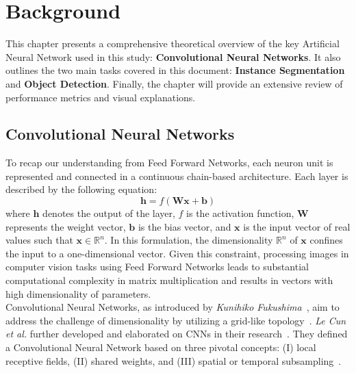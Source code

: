 \chapter{Background}
This chapter presents a comprehensive theoretical overview of the key Artificial Neural Network used in this study: \textbf{Convolutional Neural Networks}. It also outlines the two main tasks covered in this document: \textbf{Instance Segmentation} and \textbf{Object Detection}. Finally, the chapter will provide an extensive review of performance metrics and visual explanations.

\section{Convolutional Neural Networks}
To recap our understanding from Feed Forward Networks, each neuron unit is represented and connected in a continuous chain-based architecture. Each layer is described by the following equation:
\begin{equation}
\boldsymbol{h}=f\left(\boldsymbol{W}\boldsymbol{x}+\boldsymbol{b}\right) \label{eq:ff:layer}
\end{equation}
where $\boldsymbol{h}$ denotes the output of the layer, $f$ is the activation function, $\boldsymbol{W}$ represents the weight vector, $\boldsymbol{b}$ is the bias vector, and $\boldsymbol{x}$ is the input vector of real values such that $\boldsymbol{x} \in \mathbb{R}^{n}$. In this formulation, the dimensionality $\mathbb{R}^{n}$ of $\boldsymbol{x}$ confines the input to a one-dimensional vector. Given this constraint, processing images in computer vision tasks using Feed Forward Networks leads to substantial computational complexity in matrix multiplication and results in vectors with high dimensionality of parameters.\\

Convolutional Neural Networks, as introduced by \textit{Kunihiko Fukushima}~\cite{Fukushima1980}, aim to address the challenge of dimensionality by utilizing a grid-like topology~\cite{Goodfellow-et-al-2016}. \textit{Le Cun et al.} further developed and elaborated on CNNs in their research~\cite{6795724, 726791}. They defined a Convolutional Neural Network based on three pivotal concepts: (I) local receptive fields, (II) shared weights, and (III) spatial or temporal subsampling~\cite{726791}.\\

